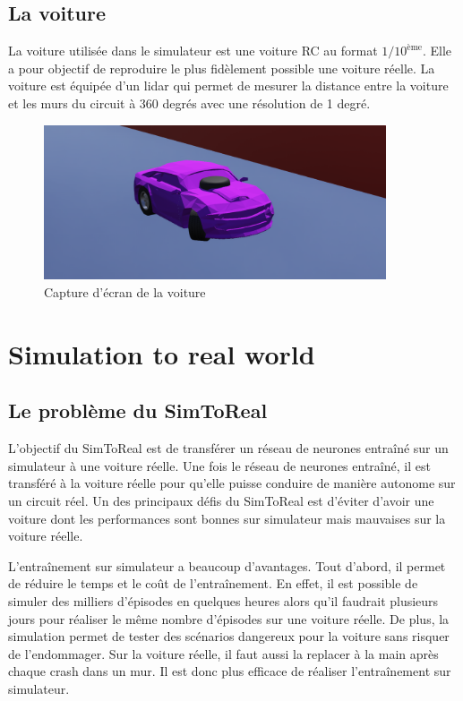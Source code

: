 \documentclass[french]{article}
\begin{document}
\subsection{La voiture}
La voiture utilisée dans le simulateur est une voiture RC au format $1/10^{\text{ème}}$. Elle a pour objectif de
reproduire le plus fidèlement possible une voiture réelle. La voiture est équipée d'un lidar qui permet de mesurer la
distance entre la voiture et les murs du circuit à 360 degrés avec une résolution de 1 degré.

\begin{figure}[H]
    \centering
    \includegraphics[width=0.9\textwidth]{Images/Voiture.png}
    \caption{Capture d'écran de la voiture}
\end{figure}


\section{Simulation to real world}

\subsection{Le problème du SimToReal}

L'objectif du SimToReal est de transférer un réseau de neurones entraîné sur un simulateur à une voiture réelle. 
Une fois le réseau de neurones entraîné, il est transféré à la voiture réelle pour qu'elle puisse conduire de manière 
autonome sur un circuit réel. Un des principaux défis du SimToReal est d'éviter d'avoir une voiture dont les performances 
sont bonnes sur simulateur mais mauvaises sur la voiture réelle.


\vspace{0.5cm}
L'entraînement sur simulateur a beaucoup d'avantages. Tout d'abord, il permet de réduire le temps et le coût
de l'entraînement. En effet, il est possible de simuler des milliers d'épisodes en quelques heures 
alors qu'il faudrait plusieurs jours pour réaliser le même nombre d'épisodes sur une voiture réelle. De plus,
la simulation permet de tester des scénarios dangereux pour la voiture sans risquer de l'endommager.
Sur la voiture réelle, il faut aussi la replacer à la main après chaque crash dans un mur. Il est donc plus
efficace de réaliser l'entraînement sur simulateur.
\end{document}

